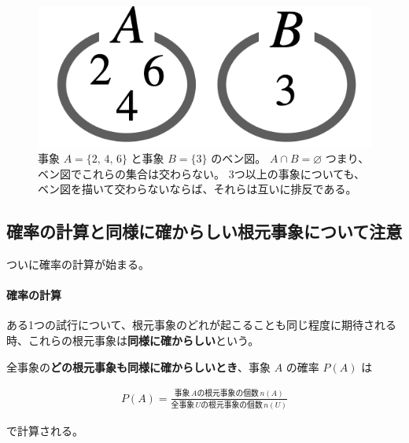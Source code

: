 \documentclass[12pt]{ltjsarticle}\usepackage{ifthen}\newcounter{enlarge}\setcounter{enlarge}{1}
\begin{document}
\begin{figure}[] 
\centering 
\includegraphics[width=6truecm]{./figure/f1-2.png}
\captionsetup{width=.9\linewidth}
\caption{%
  事象 $A = \{2,\, 4,\, 6\}$ と事象 $B = \{3\}$ のベン図。
  $A \cap B = \varnothing$ つまり、ベン図でこれらの集合は交わらない。
  3つ以上の事象についても、ベン図を描いて交わらないならば、それらは互いに排反である。
}
\label{f:1.2}
\end{figure}

\subsection{確率の計算と同様に確からしい根元事象について注意}

ついに確率の計算が始まる。

\paragraph{確率の計算}

ある1つの試行について、根元事象のどれが起こることも同じ程度に期待される時、これらの根元事象は\textbf{同様に確からしい}という。

全事象の\textbf{どの根元事象も同様に確からしいとき}、事象 $A$ の確率 $P(A)$ は
\begin{oframed}
  \begin{align}
    P(A) = \frac{\text{事象}\, A \text{の根元事象の個数}\, n(A)}{\text{全事象}\, U \text{の根元事象の個数}\, n(U)} \label{eq:1.8}
  \end{align}
\end{oframed}
\noindent
で計算される。
\end{document}
